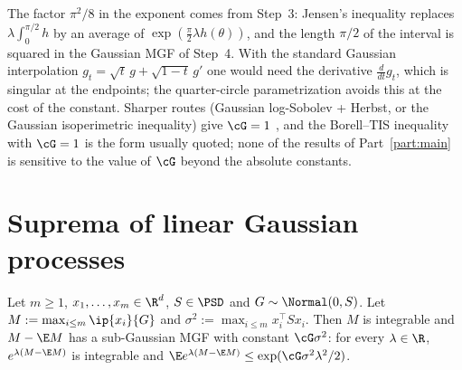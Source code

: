 \begin{remark}\label{rem:pc_constant}
The factor $\pi^2/8$ in the exponent comes from Step~3: Jensen's inequality replaces
$\lambda\int_0^{\pi/2}h$ by an average of $\exp(\frac\pi2\lambda h(\theta))$, and the length
$\pi/2$ of the interval is squared in the Gaussian MGF of Step~4. With the standard
Gaussian interpolation $g_t = \sqrt t\,g + \sqrt{1-t}\,g'$ one would need the derivative
$\frac{d}{dt}g_t$, which is singular at the endpoints; the quarter-circle parametrization
avoids this at the cost of the constant. Sharper routes (Gaussian log-Sobolev + Herbst, or
the Gaussian isoperimetric inequality) give $\cG = 1$ \cite{boucheron2013concentration,
adler2007random}, and the Borell--TIS inequality with $\cG = 1$ is the form usually quoted;
none of the results of Part~\ref{part:main} is sensitive to the value of $\cG$ beyond the
absolute constants.
\end{remark}

\section{Suprema of linear Gaussian processes}
\label{sec:pre_concentration_sup}

\begin{lemma}
\label{lem:finite_sup_subgaussian}
\leanok
{}
Let $m \ge 1$, $x_1,\dots,x_m \in \R^d$, $S \in \PSD$ and $G \sim \Normal(0,S)$. Let
$M := \max_{i\le m}\ip{x_i}{G}$ and $\sigma^2 := \max_{i\le m}x_i^\top Sx_i$. Then $M$ is
integrable and $M - \E M$ has a sub-Gaussian MGF with constant $\cG\sigma^2$: for every
$\lambda\in\R$, $e^{\lambda(M - \E M)}$ is integrable and
$\E e^{\lambda(M-\E M)} \le \exp(\cG\sigma^2\lambda^2/2)$.
\end{lemma}

